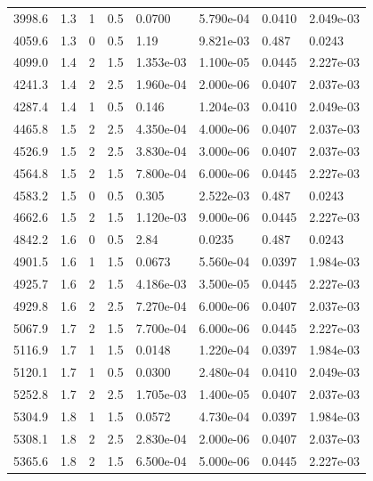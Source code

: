 \documentclass[preview]{standalone}
\begin{document}
{{{\begin{tabular}{L{1.2cm}C{1.2cm} C{0.3cm}C{0.5cm} C{1.4cm}C{1.4cm} C{1.4cm}C{1.4cm}}
  3998.6  &   1.3  & 1     & 0.5 &  0.0700  & 5.790e-04  & 0.0410 &  2.049e-03   \\ 
  4059.6  &   1.3  & 0     & 0.5 &  1.19  & 9.821e-03  & 0.487 &  0.0243   \\ 
  4099.0  &   1.4  & 2     & 1.5 &  1.353e-03  & 1.100e-05  & 0.0445 &  2.227e-03   \\ 
  4241.3  &   1.4  & 2     & 2.5 &  1.960e-04  & 2.000e-06  & 0.0407 &  2.037e-03   \\ 
  4287.4  &   1.4  & 1     & 0.5 &  0.146  & 1.204e-03  & 0.0410 &  2.049e-03   \\ 
  4465.8  &   1.5  & 2     & 2.5 &  4.350e-04  & 4.000e-06  & 0.0407 &  2.037e-03   \\ 
  4526.9  &   1.5  & 2     & 2.5 &  3.830e-04  & 3.000e-06  & 0.0407 &  2.037e-03   \\ 
  4564.8  &   1.5  & 2     & 1.5 &  7.800e-04  & 6.000e-06  & 0.0445 &  2.227e-03   \\ 
  4583.2  &   1.5  & 0     & 0.5 &  0.305  & 2.522e-03  & 0.487 &  0.0243   \\ 
  4662.6  &   1.5  & 2     & 1.5 &  1.120e-03  & 9.000e-06  & 0.0445 &  2.227e-03   \\ 
  4842.2  &   1.6  & 0     & 0.5 &  2.84  & 0.0235  & 0.487 &  0.0243   \\ 
  4901.5  &   1.6  & 1     & 1.5 &  0.0673  & 5.560e-04  & 0.0397 &  1.984e-03   \\ 
  4925.7  &   1.6  & 2     & 1.5 &  4.186e-03  & 3.500e-05  & 0.0445 &  2.227e-03   \\ 
  4929.8  &   1.6  & 2     & 2.5 &  7.270e-04  & 6.000e-06  & 0.0407 &  2.037e-03   \\ 
  5067.9  &   1.7  & 2     & 1.5 &  7.700e-04  & 6.000e-06  & 0.0445 &  2.227e-03   \\ 
  5116.9  &   1.7  & 1     & 1.5 &  0.0148  & 1.220e-04  & 0.0397 &  1.984e-03   \\ 
  5120.1  &   1.7  & 1     & 0.5 &  0.0300  & 2.480e-04  & 0.0410 &  2.049e-03   \\ 
  5252.8  &   1.7  & 2     & 2.5 &  1.705e-03  & 1.400e-05  & 0.0407 &  2.037e-03   \\ 
  5304.9  &   1.8  & 1     & 1.5 &  0.0572  & 4.730e-04  & 0.0397 &  1.984e-03   \\ 
  5308.1  &   1.8  & 2     & 2.5 &  2.830e-04  & 2.000e-06  & 0.0407 &  2.037e-03   \\ 
  5365.6  &   1.8  & 2     & 1.5 &  6.500e-04  & 5.000e-06  & 0.0445 &  2.227e-03   \\ 

\end{tabular}}}}
\end{document}

